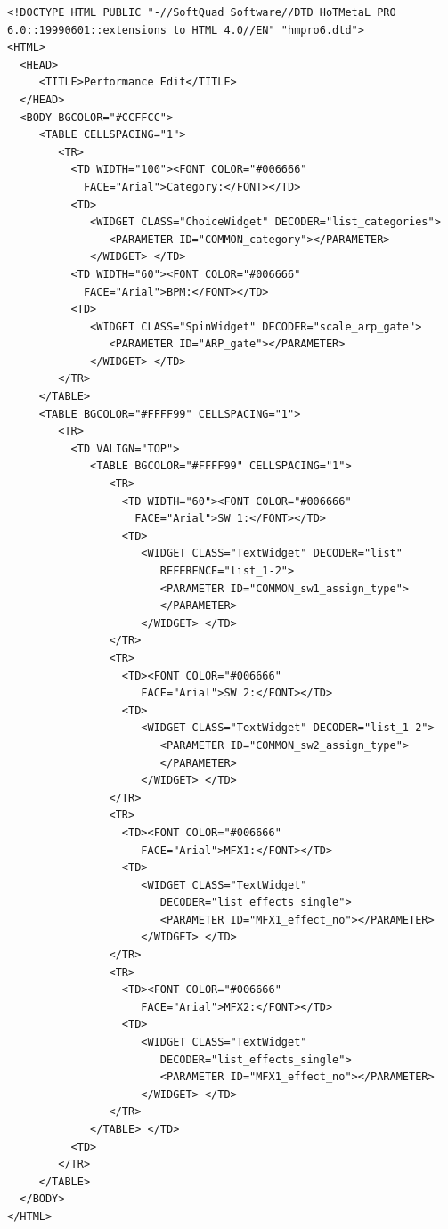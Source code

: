 \documentclass[a4paper,twoside,12pt]{article}
\begin{document}
\begin{verbatim}
<!DOCTYPE HTML PUBLIC "-//SoftQuad Software//DTD HoTMetaL PRO
6.0::19990601::extensions to HTML 4.0//EN" "hmpro6.dtd">
<HTML>
  <HEAD>
     <TITLE>Performance Edit</TITLE>
  </HEAD>
  <BODY BGCOLOR="#CCFFCC">
     <TABLE CELLSPACING="1">
        <TR>
          <TD WIDTH="100"><FONT COLOR="#006666"
            FACE="Arial">Category:</FONT></TD>
          <TD>
             <WIDGET CLASS="ChoiceWidget" DECODER="list_categories">
                <PARAMETER ID="COMMON_category"></PARAMETER>
             </WIDGET> </TD>
          <TD WIDTH="60"><FONT COLOR="#006666"
            FACE="Arial">BPM:</FONT></TD>
          <TD>
             <WIDGET CLASS="SpinWidget" DECODER="scale_arp_gate">
                <PARAMETER ID="ARP_gate"></PARAMETER>
             </WIDGET> </TD>
        </TR>
     </TABLE>
     <TABLE BGCOLOR="#FFFF99" CELLSPACING="1">
        <TR>
          <TD VALIGN="TOP">
             <TABLE BGCOLOR="#FFFF99" CELLSPACING="1">
                <TR>
                  <TD WIDTH="60"><FONT COLOR="#006666"
                    FACE="Arial">SW 1:</FONT></TD>
                  <TD>
                     <WIDGET CLASS="TextWidget" DECODER="list"
                        REFERENCE="list_1-2">
                        <PARAMETER ID="COMMON_sw1_assign_type">
                        </PARAMETER>
                     </WIDGET> </TD>
                </TR>
                <TR>
                  <TD><FONT COLOR="#006666"
                     FACE="Arial">SW 2:</FONT></TD>
                  <TD>
                     <WIDGET CLASS="TextWidget" DECODER="list_1-2">
                        <PARAMETER ID="COMMON_sw2_assign_type">
                        </PARAMETER>
                     </WIDGET> </TD>
                </TR>
                <TR>
                  <TD><FONT COLOR="#006666"
                     FACE="Arial">MFX1:</FONT></TD>
                  <TD>
                     <WIDGET CLASS="TextWidget"
                        DECODER="list_effects_single">
                        <PARAMETER ID="MFX1_effect_no"></PARAMETER>
                     </WIDGET> </TD>
                </TR>
                <TR>
                  <TD><FONT COLOR="#006666"
                     FACE="Arial">MFX2:</FONT></TD>
                  <TD>
                     <WIDGET CLASS="TextWidget"
                        DECODER="list_effects_single">
                        <PARAMETER ID="MFX1_effect_no"></PARAMETER>
                     </WIDGET> </TD>
                </TR>
             </TABLE> </TD>
          <TD>
        </TR>
     </TABLE>
  </BODY>
</HTML>
\end{verbatim}
\end{document}
